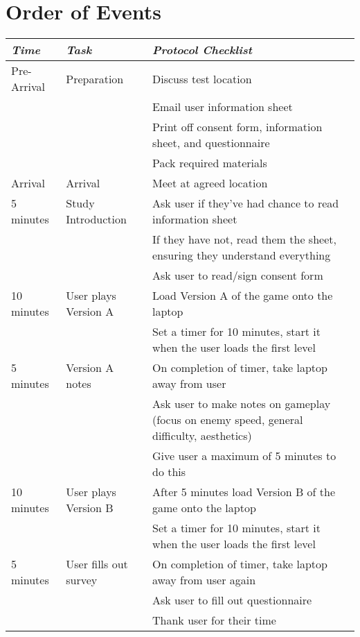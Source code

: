 \documentclass[12pt, a4paper]{report}
\begin{document}
\section{Order of Events}
\begin{table}[]
\begin{tabular}{p{}|p{}|p{}}
\emph{Time} & \emph{Task}           & \emph{Protocol Checklist}\\
\hline
Pre-Arrival & Preparation           & Discuss test location\\
            &                       & Email user information sheet\\
            &                       & Print off consent form, information sheet, and questionnaire\\
            &                       & Pack required materials\\
\hline
Arrival     & Arrival               & Meet at agreed location\\
\hline
5 minutes   & Study Introduction    & Ask user if they've had chance to read information sheet\\
            &                       & If they have not, read them the sheet, ensuring they understand everything\\
            &                       & Ask user to read/sign consent form\\
\hline
10 minutes  & User plays Version A  & Load Version A of the game onto the laptop\\
            &                       & Set a timer for 10 minutes, start it when the user loads the first level\\
\hline
5 minutes   & Version A notes       & On completion of timer, take laptop away from user\\
            &                       & Ask user to make notes on gameplay (focus on enemy speed, general difficulty, aesthetics)\\
            &                       & Give user a maximum of 5 minutes to do this\\
\hline
10 minutes  & User plays Version B  & After 5 minutes load Version B of the game onto the laptop\\
            &                       & Set a timer for 10 minutes, start it when the user loads the first level\\
\hline
5 minutes   & User fills out survey & On completion of timer, take laptop away from user again\\
            &                       & Ask user to fill out questionnaire\\
            &                       & Thank user for their time\\
\end{tabular}
\end{table}
\end{document}
